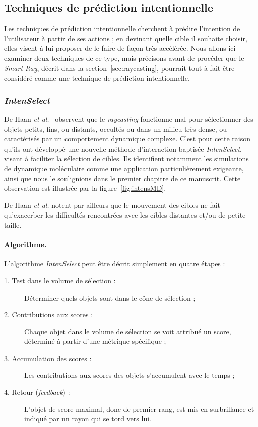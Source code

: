 	\subsection{Techniques de prédiction intentionnelle}
	Les techniques de prédiction intentionnelle cherchent à prédire l'intention de l'utilisateur à partir de ses actions ; en \og devinant \fg{} quelle cible il souhaite choisir, elles visent à lui proposer de le faire de façon très accélérée. Nous allons ici examiner deux techniques de ce type, mais précisons avant de procéder que le \emph{Smart Ray}, décrit dans la section~\ref{sec:raycasting}, pourrait tout à fait être considéré comme une technique de prédiction intentionnelle.
	
	\subsubsection{\emph{IntenSelect}}
	\label{sub:intenSelect}
	De Haan \emph{et al.}~\cite{de2005intenselect} observent que le \emph{raycasting} fonctionne mal pour sélectionner des objets petits, fins, ou distants, occultés ou dans un milieu très dense, ou caractérisés par un comportement dynamique complexe. C'est pour cette raison qu'ils ont développé une nouvelle méthode d'interaction baptisée \emph{IntenSelect}, visant à faciliter la sélection de cibles. Ils identifient notamment les simulations de dynamique moléculaire comme une application particulièrement exigeante, ainsi que nous le soulignions dans le premier chapitre de ce manuscrit. Cette observation est illustrée par la figure~\ref{fig:intensMD}.
	
	De Haan \emph{et al.} notent par ailleurs que le mouvement des cibles ne fait qu'exacerber les difficultés rencontrées avec les cibles distantes et/ou de petite taille.
	
	\paragraph{Algorithme.}
	L'algorithme \emph{IntenSelect} peut être décrit simplement en quatre étapes :
	
	\begin{description}
		\item[1. Test dans le volume de sélection :] Déterminer quels objets sont dans le cône de sélection ;
		\item[2. Contributions aux scores :] Chaque objet dans le volume de sélection se voit attribué un score, déterminé à partir d'une métrique spécifique ;
		\item[3. Accumulation des scores :] Les contributions aux scores des objets s'accumulent avec le temps ;
		\item[4. Retour (\emph{feedback}) :] L'objet de score maximal, donc de premier rang, est mis en surbrillance et indiqué par un rayon qui se \og tord \fg{} vers lui.
	\end{description}
	
